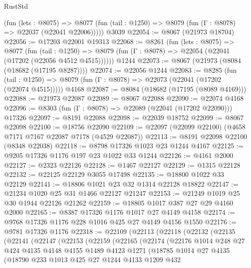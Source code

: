 \begin{lexlean}{RustStd}
\begin{coremodule}
      (fun (lets : @8075) =>
      @8077 (fun (tail : @1250) => @8079 (fun (Γ : @8078) => @22037 (@22041 @22006)))))
    @3039
@22054 := @8067 (@21973 @18704)
@22056 := @17203 @22001 @19313
@22068 := @8261
    (fun (lets : @8075) =>
    @8077
      (fun (tail : @1250) =>
      @8079 (fun (Γ : @8078) => @22054 (@22041 (@17202 (@22056 @4512 @4515))))))
    @1244
@22073 := @8067 (@21973 (@8084 (@18682 (@17195 @8287))))
@22074 := @22056 @1244
@22083 := @8285
    (fun (tail : @1250) => @8079 (fun (Γ : @8078) => @22073 (@22041 (@17202 (@22074 @4515)))))
    @4168
@22087 := @8084 (@18682 (@17195 (@8089 @4169)))
@22088 := @21973 @22087
@22089 := @8067 @22088
@22090 := @22074 @4168
@22096 := @8303 (fun (Γ : @8078) => @22089 (@22041 (@17202 @22090))) @17326
@22097 := @8191 @22088
@22098 := @22039 @18752
@22099 := @8067 @22098
@22100 := @18756 @22090
@22109 := @22097 (@22099 @22100) (@4658 @7171 @7167 @22087 @7178 (@4529 @22087))
@22113 := @8191 @22098 @22100 (@8348 @22038)
@22118 := @8798 @17326 @1023 @23 @1244 @4167
@22125 := @9205 @17326 @1176 @197 @23 @1022 @33 @1244
@22126 := @4161 @2000
@22127 := @2323 @22126
@22128 := @1467 @22127
@22129 := @1315 @22128
@22132 := @22125 @22129 @3055 @17498
@22135 := @18800 @1022 @33 @22129
@22141 := @18806 @1021 @23 @32 @1314 @22128 @18822
@22147 := @21234 @1020 @25 @31 @1466 @22127 @21247
@22153 := @21249 @1019 @25 @30 @1944 @22126 @21262
@22159 := @18805 @1017 @387 @27 @29 @4160 @2000
@22165 := @8387 @17326 @1176 @1017 @27 @4149 @4158
@22174 := @9768 @17326 @1176 @228 @1016 @425 @27 @4149 @4156 @1550
@22176 := @9781 @17326 @1176
@22318 := @22109
    (@22113
      (@22118
        (@22132
          (@22135
            (@22141
              (@22147
                (@22153
                  (@22159
                    (@22165
                      (@22174
                        (@22176
                          @1014
                          @248
                          @27
                          @424
                          @4135
                          @4148
                          @4155
                          @1489
                          @4123
                          @1271
                          (@18785
                            @1014
                            @27
                            @4135
                            (@18790
                              @233
                              @1013
                              @425
                              @27
                              @1244
                              @4133
                              @1209
                              @432

\end{coremodule}
\end{lexlean}
